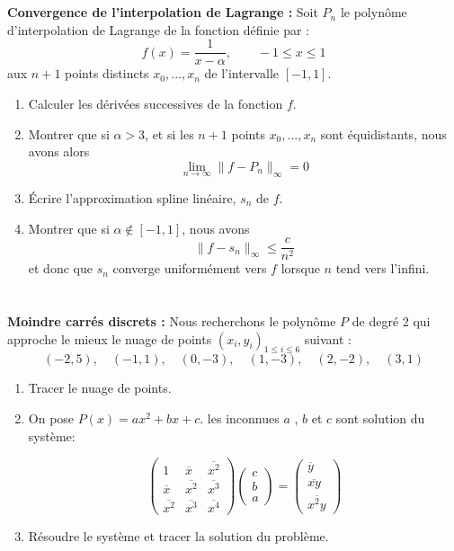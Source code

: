 \documentclass[a4paper]{article}
\begin{document}
\section{} {\bf Convergence de l'interpolation de Lagrange : } Soit $P_n$ le polynôme d'interpolation de Lagrange de la fonction définie par :
\[f(x) = \frac 1{x-\alpha},\qquad -1\leq x \leq 1 \]
aux $n + 1$ points distincts $x_0, ..., x_n$ de l'intervalle $[-1,1]$.
\begin{enumerate}
\item Calculer les dérivées successives de la fonction $f$.
\item  Montrer que si $\alpha > 3$, et si les $n + 1$ points $x_0, ..., x_n$ sont équidistants, nous avons alors
\[\lim_{n\to \infty}\|f-P_n\|_{\infty}=0\]
\item Écrire l'approximation spline linéaire, $s_n$ de $f$.
\item  Montrer que si $\alpha \notin [-1,1]$, nous avons
\[\|f-s_n\|_{ \infty}\leq \frac c{n^2}\]
et donc que $s_n$ converge uniformément vers $f$ lorsque $n$ tend vers l'infini.
\end{enumerate}

\section{} {\bf Moindre carrés discrets : }
Nous recherchons le polynôme $P$ de degré 2 qui approche le mieux le nuage de points $(x_i, y_i)_{1\leq i\leq 6}$  suivant :
\[(-2,5),\quad(-1,1),\quad (0, -3),\quad (1, -3),\quad (2, -2),\quad (3, 1)\]

\begin{enumerate}
\item  Tracer le nuage de points.
\item On pose $P(x)=ax^2+bx+c$. les inconnues $a$ , $b$ et $c$ sont solution du système:

\[\left(\begin{array}{ccc}
1 & \overline{x} & \overline{x^2}\\
\overline{x} & \overline{x^2} & \overline{x^3} \\
 \overline{x^2} & \overline{x^3} & \overline{x^4} 
\end{array}\right) \left(\begin{array}{c}
c \\
b \\
a 
\end{array}
\right) =\left(\begin{array}{c}
\overline{y} \\
\overline{x y} \\
\overline{x^2 y} 
\end{array}
\right) 
\]

\item  Résoudre le système et tracer la solution du problème.
\end{enumerate}
\end{document}
